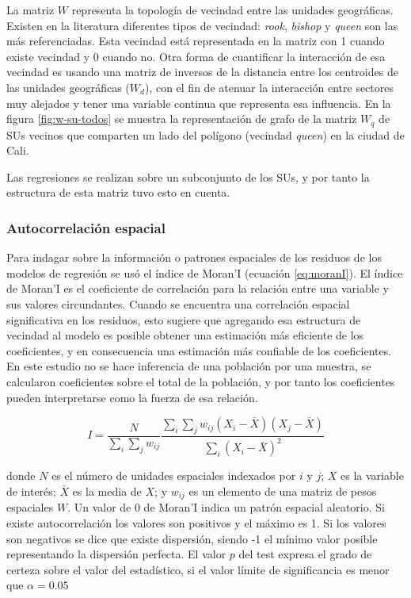 \documentclass[12pt,a4paper,oneside, openany]{book}
\theoremstyle{definition}
\theoremstyle{definition}
\theoremstyle{definition}
\theoremstyle{remark}
\begin{document}
La matriz \(W\) representa la topología de vecindad entre las unidades
geográficas. Existen en la literatura diferentes tipos de vecindad:
\emph{rook}, \emph{bishop} y \emph{queen} son las más referenciadas.
Esta vecindad está representada en la matriz con 1 cuando existe
vecindad y 0 cuando no. Otra forma de cuantificar la interacción de esa
vecindad es usando una matriz de inversos de la distancia entre los
centroides de las unidades geográficas (\(W_d\)), con el fin de atenuar
la interacción entre sectores muy alejados y tener una variable continua
que representa esa influencia. En la figura \ref{fig:w-su-todos} se
muestra la representación de grafo de la matriz \(W_q\) de SUs vecinos
que comparten un lado del polígono (vecindad \emph{queen}) en la ciudad
de Cali.

Las regresiones se realizan sobre un subconjunto de los SUs, y por tanto
la estructura de esta matriz tuvo esto en cuenta.

\subsubsection{Autocorrelación
espacial}\label{autocorrelaciuxf3n-espacial}

Para indagar sobre la información o patrones espaciales de los residuos
de los modelos de regresión se usó el índice de Moran'I (ecuación
\eqref{eq:moranI}). El índice de Moran'I es el coeficiente de correlación
para la relación entre una variable y sus valores circundantes. Cuando
se encuentra una correlación espacial significativa en los residuos,
esto sugiere que agregando esa estructura de vecindad al modelo es
posible obtener una estimación más eficiente de los coeficientes, y en
consecuencia una estimación más confiable de los coeficientes. En este
estudio no se hace inferencia de una población por una muestra, se
calcularon coeficientes sobre el total de la población, y por tanto los
coeficientes pueden interpretarse como la fuerza de esa relación.

\begin{equation}
 I=\frac {N}{\sum _{i}\sum _{j}w_{ij}} \frac {\sum _{i}\sum _{j}w_{ij}(X_{i}-{\bar {X}})(X_{j}-{\bar {X}})}{\sum _{i}(X_{i}- \bar{X})^{2}}
\label{eq:moranI}
\end{equation}

donde \(N\) es el número de unidades espaciales indexados por \(i\) y
\(j\); \(X\) es la variable de interés; \(\bar {X}\) es la media de
\(X\); y \(w_{ij}\) es un elemento de una matriz de pesos espaciales
\(W\). Un valor de 0 de Moran'I indica un patrón espacial aleatorio. Si
existe autocorrelación los valores son positivos y el máximo es 1. Si
los valores son negativos se dice que existe dispersión, siendo -1 el
mínimo valor posible representando la dispersión perfecta. El valor
\textbf{\(p\)} del test expresa el grado de certeza sobre el valor del
estadístico, si el valor límite de significancia es menor que
\(\alpha = 0.05\)
\end{document}
